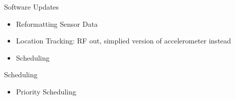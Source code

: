 \begin{frame}{Software Updates}
    \begin{itemize}
        \item Reformatting Sensor Data
        \item Location Tracking: RF out, simplied version of accelerometer instead
        \item Scheduling
    \end{itemize}    
\end{frame}

\begin{frame}{Scheduling}
    \begin{itemize}
        \item Priority Scheduling
    \end{itemize}    
\end{frame}

